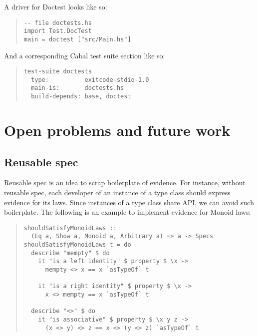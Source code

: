 \documentclass[preprint]{sigplanconf}
\begin{document}
\noindent A driver for Doctest looks like so:

\begin{quote}
\small
\begin{verbatim}
-- file doctests.hs
import Test.DocTest
main = doctest ["src/Main.hs"]
\end{verbatim}
\end{quote}

\noindent And a corresponding Cabal test suite section like so:

\begin{quote}
\small
\begin{verbatim}
test-suite doctests
  type:          exitcode-stdio-1.0
  main-is:       doctests.hs
  build-depends: base, doctest
\end{verbatim}
\end{quote}

\section{Open problems and future work}

\subsection{Reusable spec}

Reusable spec is an idea to scrap boilerplate of evidence.
For instance, without reusable spec,
each developer of an instance of a type class should
express evidence for its laws.
Since instances of a type class share API,
we can avoid such boilerplate.
The following is an example to implement
evidence for Monoid laws:

\begin{quote}
\small
\begin{verbatim}
shouldSatisfyMonoidLaws ::
  (Eq a, Show a, Monoid a, Arbitrary a) => a -> Specs
shouldSatisfyMonoidLaws t = do
  describe "mempty" $ do
    it "is a left identity" $ property $ \x ->
      mempty <> x == x `asTypeOf` t

    it "is a right identity" $ property $ \x ->
      x <> mempty == x `asTypeOf` t

  describe "<>" $ do
    it "is associative" $ property $ \x y z ->
      (x <> y) <> z == x <> (y <> z) `asTypeOf` t
\end{verbatim}
\end{quote}
\end{document}
